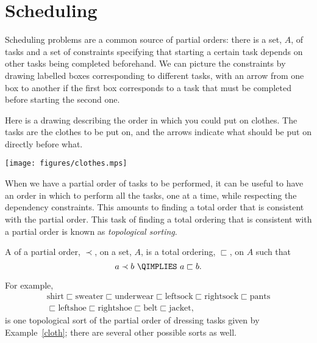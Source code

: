 \begin{problems}
\classproblems
{}
\end{problems}

\section{Scheduling}

Scheduling problems are a common source of partial orders: there is a set,
$A$, of tasks and a set of constraints specifying that starting a certain
task depends on other tasks being completed beforehand.  We can picture
the constraints by drawing labelled boxes corresponding to different
tasks, with an arrow from one box to another if the first box corresponds
to a task that must be completed before starting the second one.

\begin{samepage}
\begin{example}\label{cloth}
Here is a drawing describing the order in which you could put on clothes.
The tasks are the clothes to be put on, and the arrows indicate what should be
put on directly before what.
\begin{center}\texttt{[image: figures/clothes.mps]}\end{center}
\end{example}
\end{samepage}

When we have a partial order of tasks to be performed, it can be useful to
have an order in which to perform all the tasks, one at a time, while
respecting the dependency constraints.  This amounts to finding a total
order that is consistent with the partial order.  This task of finding a
total ordering that is consistent with a partial order is known as
\emph{topological sorting}. \iffalse probably because the sort is based
only on the topology (shape) of the poset and not on the actual values.\fi

\begin{definition}
A  of a partial order, $\prec$, on a set, $A$, is
a total ordering, $\sqsubset$, on $A$ such that
\[
a \prec b\ \QIMPLIES\  a \sqsubset b.
\]
\end{definition}

For example,
\begin{align*}
  \text{shirt} \sqsubset \text{sweater} \sqsubset \text{underwear}
  \sqsubset \text{leftsock}
  \sqsubset \text{rightsock} \sqsubset \text{pants}\\
  \sqsubset \text{leftshoe} \sqsubset \text{rightshoe} \sqsubset
  \text{belt} \sqsubset \text{jacket},
\end{align*}
is one topological sort of the partial order of dressing tasks given by
Example~\ref{cloth}; there are several other possible sorts as well.

